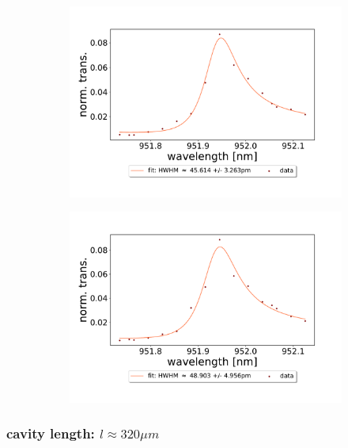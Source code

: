 \begin{figure}[h!] \ContinuedFloat
    \centering
    \begin{subfigure}[b]{0.49\textwidth}
        \includegraphics[width=\textwidth]{figures/results/double fano fits/20250326/453um_M3:M5_fit_7.pdf}
        \caption{}
        \label{fig:453um_M3:M5_fit_7}
    \end{subfigure}
    \begin{subfigure}[b]{0.49\textwidth}
        \includegraphics[width=\textwidth]{figures/results/double fano fits/20250326/453um_M3:M5_fit_8.pdf}
        \caption{}
        \label{fig:453um_M3:M5_fit_8}
    \end{subfigure}
\end{figure}

\clearpage
\subsubsection*{cavity length: $l \approx 320 \mu m$}

